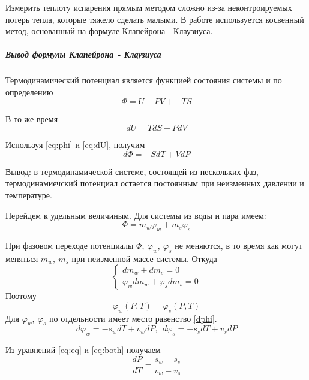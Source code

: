 \documentclass[12pt]{article}
\renewcommand{\phi}{\ensuremath{\varphi}}
\begin{document}
		Измерить теплоту испарения прямым методом сложно из-за неконтроируемых потерь тепла, которые тяжело сделать малыми. В работе используется косвенный метод, основанный на формуле Клапейрона - Клаузиуса.
		\subparagraph{Вывод формулы Клапейрона - Клаузиуса}
		Термодинамический потенциал является функцией состояния системы  и по определению
		\begin{equation}\label{eq:phi}
		\Phi = U + PV + - TS
		\end{equation}
		
		В то же время
		\begin{equation}\label{eq:dU}
		dU = TdS - PdV
		\end{equation}
		
		Используя \ref{eq:phi} и \ref{eq:dU}, получим
		\begin{equation}\label{dphi}
		d\Phi = -SdT + VdP
		\end{equation}
		
		Вывод: в термодинамической системе, состоящей из нескольких фаз, термодинамиечский потенциал остается постоянным при неизменных давлении и температуре.
		
		Перейдем к удельным величиным. Для системы из воды и пара имеем:
		\begin{equation}
		\Phi = m_w\phi_w + m_s\phi_s
		\end{equation}
		
		При фазовом переходе потенциалы $\Phi,\ \phi_w,\ \phi_s$ не меняются, в то время как могут меняться $m_w,\ m_s$ при неизменной массе системы. Откуда
		\begin{equation}
		\begin{cases}
				dm_w + dm_s = 0\\
				\phi_wdm_w + \phi_sdm_s = 0
		\end{cases}
		\end{equation}	
		Поэтому
		\begin{equation}\label{eq:eq}	
			\phi_w(P,T) = \phi_s(P,T)
		\end{equation}	
		Для $\phi_w,\ \phi_s$  по отдельности имеет место равенство \ref{dphi}.
		\begin{equation}\label{eq:both}
		d\phi_w = -s_wdT + v_wdP, \ \ d\phi_s = - s_sdT + v_sdP 
		\end{equation}
		
		Из уравнений \ref{eq:eq} и \ref{eq:both} получаем
		\begin{equation}
		\dfrac{dP}{dT} = \dfrac{s_w-s_s}{v_w-v_s}
		\end{equation} 
		
\end{document}
